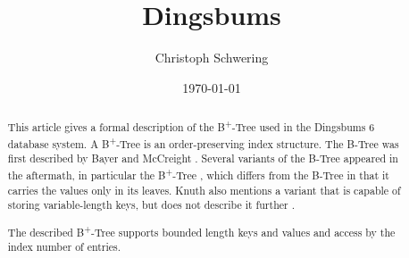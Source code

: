 \documentclass[a4paper, 8pt, twoclumn]{scrartcl}
\title{Dingsbums \BTree}
\date{\today}
\author{Christoph Schwering}
\theoremstyle{plain}
\theoremstyle{definition}
\theoremstyle{remark}
\newcommand{\BTree}{ B\textsuperscript{+}-Tree }
\begin{document}



\maketitle

\begin{abstract}
This article gives a formal description of the \BTree used in the Dingsbums 6
database system.
A \BTree is an order-preserving index structure.
The B-Tree was first described by Bayer and McCreight \cite{Bayer}.
Several variants of the B-Tree appeared in the aftermath, in particular the
\BTree \cite{Cormen, KnuthBTree}, which differs from the B-Tree in that it
carries the values only in its leaves.
Knuth also mentions a variant that is capable of storing variable-length
keys, but does not describe it further \cite{KnuthBTree}.

The described \BTree supports bounded length keys and values and access by 
the index number of entries.
\end{abstract}
\end{document}
